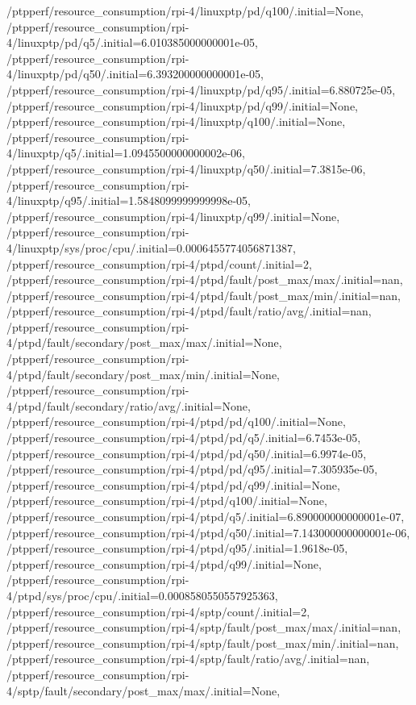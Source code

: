 {    /ptpperf/resource_consumption/rpi-4/linuxptp/pd/q100/.initial=None,
    /ptpperf/resource_consumption/rpi-4/linuxptp/pd/q5/.initial=6.010385000000001e-05,
    /ptpperf/resource_consumption/rpi-4/linuxptp/pd/q50/.initial=6.393200000000001e-05,
    /ptpperf/resource_consumption/rpi-4/linuxptp/pd/q95/.initial=6.880725e-05,
    /ptpperf/resource_consumption/rpi-4/linuxptp/pd/q99/.initial=None,
    /ptpperf/resource_consumption/rpi-4/linuxptp/q100/.initial=None,
    /ptpperf/resource_consumption/rpi-4/linuxptp/q5/.initial=1.0945500000000002e-06,
    /ptpperf/resource_consumption/rpi-4/linuxptp/q50/.initial=7.3815e-06,
    /ptpperf/resource_consumption/rpi-4/linuxptp/q95/.initial=1.5848099999999998e-05,
    /ptpperf/resource_consumption/rpi-4/linuxptp/q99/.initial=None,
    /ptpperf/resource_consumption/rpi-4/linuxptp/sys/proc/cpu/.initial=0.0006455774056871387,
    /ptpperf/resource_consumption/rpi-4/ptpd/count/.initial=2,
    /ptpperf/resource_consumption/rpi-4/ptpd/fault/post_max/max/.initial=nan,
    /ptpperf/resource_consumption/rpi-4/ptpd/fault/post_max/min/.initial=nan,
    /ptpperf/resource_consumption/rpi-4/ptpd/fault/ratio/avg/.initial=nan,
    /ptpperf/resource_consumption/rpi-4/ptpd/fault/secondary/post_max/max/.initial=None,
    /ptpperf/resource_consumption/rpi-4/ptpd/fault/secondary/post_max/min/.initial=None,
    /ptpperf/resource_consumption/rpi-4/ptpd/fault/secondary/ratio/avg/.initial=None,
    /ptpperf/resource_consumption/rpi-4/ptpd/pd/q100/.initial=None,
    /ptpperf/resource_consumption/rpi-4/ptpd/pd/q5/.initial=6.7453e-05,
    /ptpperf/resource_consumption/rpi-4/ptpd/pd/q50/.initial=6.9974e-05,
    /ptpperf/resource_consumption/rpi-4/ptpd/pd/q95/.initial=7.305935e-05,
    /ptpperf/resource_consumption/rpi-4/ptpd/pd/q99/.initial=None,
    /ptpperf/resource_consumption/rpi-4/ptpd/q100/.initial=None,
    /ptpperf/resource_consumption/rpi-4/ptpd/q5/.initial=6.890000000000001e-07,
    /ptpperf/resource_consumption/rpi-4/ptpd/q50/.initial=7.143000000000001e-06,
    /ptpperf/resource_consumption/rpi-4/ptpd/q95/.initial=1.9618e-05,
    /ptpperf/resource_consumption/rpi-4/ptpd/q99/.initial=None,
    /ptpperf/resource_consumption/rpi-4/ptpd/sys/proc/cpu/.initial=0.0008580550557925363,
    /ptpperf/resource_consumption/rpi-4/sptp/count/.initial=2,
    /ptpperf/resource_consumption/rpi-4/sptp/fault/post_max/max/.initial=nan,
    /ptpperf/resource_consumption/rpi-4/sptp/fault/post_max/min/.initial=nan,
    /ptpperf/resource_consumption/rpi-4/sptp/fault/ratio/avg/.initial=nan,
    /ptpperf/resource_consumption/rpi-4/sptp/fault/secondary/post_max/max/.initial=None,
}
